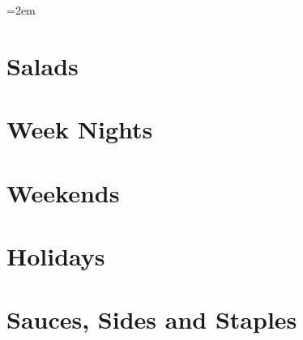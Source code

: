 \documentclass[landscape,12pt,openany]{book}
\begin{document}
\rmfamily

\setlength{\columnseprule}{0pt}
\columnsep=2em

\setcounter{tocdepth}{1}
\small
\tableofcontents

\normalsize

\setlength{\parskip}{.5em}

\chapter{Salads}











\chapter{Week Nights}















\chapter{Weekends}













\chapter{Holidays}






\chapter{Sauces, Sides and Staples}







\end{document}
